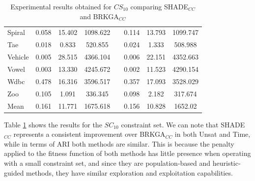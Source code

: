 \documentclass[review]{elsarticle}
\begin{document}
\begin{table}[!h]
{\begin{tabular}{l ccc c ccc}
			Spiral & 0.058 & 15.402 & 1098.622 && 0.114 & 13.793 & 1099.747 \\
			Tae & 0.018 & 0.833 & 520.855 && 0.024 & 1.333 & 508.988 \\
			Vehicle & 0.005 & 28.515 & 4366.104 && 0.006 & 22.151 & 4352.663 \\
			Vowel & 0.003 & 13.330 & 4245.672 && 0.002 & 11.523 & 4290.154 \\
			Wdbc & 0.478 & 16.316 & 3596.517 && 0.357 & 17.093 & 3528.029 \\
			Zoo & 0.105 & 1.091 & 336.345 && 0.098 & 2.182 & 317.674 \\
			\hline
			Mean & 0.161 & 11.771 & 1675.618 && 0.156 & 10.828 & 1652.02 \\
			\hline

		\end{tabular}}

	\caption{Experimental results obtained for $CS_{10}$ comparing SHADE$_{CC}$ and BRKGA$_{CC}$}
	\label{tab:results10}
\end{table}

Table \ref{tab:results10} shows the results for the $SC_{10}$ constraint set. We can note that SHADE$_{CC}$ represents a consistent improvement over BRKGA$_{CC}$ in both Unsat and Time, while in terms of ARI both methods are similar. This is because the penalty applied to the fitness function of both methods has little presence when operating with a small constraint set, and since they are population-based and heuristic-guided methods, they have similar exploration and exploitation capabilities.
\end{document}
